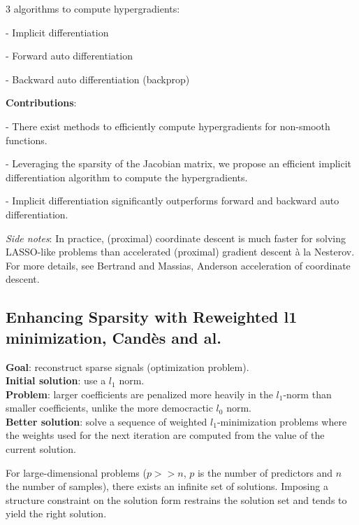 \documentclass[a4paper,10pt]{article}
\theoremstyle{definition}
\begin{document}
\vskip 0.1in

3 algorithms to compute hypergradients:
\begin{list}{}{}
    \item - Implicit differentiation
    \item - Forward auto differentiation
    \item - Backward auto differentiation (backprop)
\end{list}

\vskip 0.1in

\textbf{Contributions}:
\begin{list}{}{}
    \item - There exist methods to efficiently compute hypergradients for non-smooth functions.
    \item - Leveraging the sparsity of the Jacobian matrix, we propose an efficient implicit differentiation algorithm to compute the hypergradients.
    \item - Implicit differentiation significantly outperforms forward and backward auto differentiation.
\end{list}

\vskip 0.1in

\textit{Side notes}: In practice, (proximal) coordinate descent is much faster for solving LASSO-like problems than accelerated (proximal) gradient descent à la Nesterov.
For more details, see Bertrand and Massias, Anderson acceleration of coordinate descent.

\subsection{Enhancing Sparsity with Reweighted l1 minimization, Candès and al.}

\textbf{Goal}: reconstruct sparse signals (optimization problem). \\
\textbf{Initial solution}: use a $l_1$ norm. \\
\textbf{Problem}: larger coefficients are penalized more heavily in the $l_1$-norm than smaller coefficients, unlike the more democractic $l_0$ norm. \\
\textbf{Better solution}: solve a sequence of weighted $l_1$-minimization problems where the weights used for the next iteration are computed from the value of the current solution.

\vskip 0.1in

For large-dimensional problems ($p >> n$, $p$ is the number of predictors and $n$ the number of samples), there exists an infinite set of solutions. Imposing a structure constraint on
the solution form restrains the solution set and tends to yield the right solution.
\end{document}
